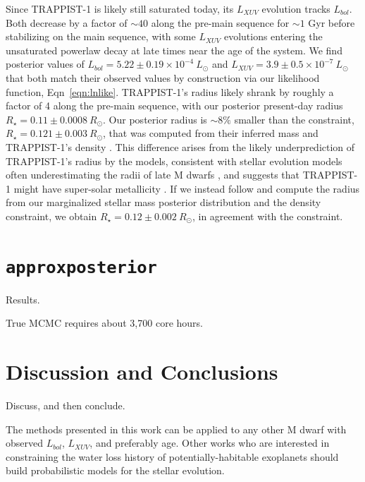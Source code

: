 \documentclass[twocolumn]{aastex62}
\newcommand{\approxposterior}[0]{\texttt{approxposterior}\xspace}
\begin{document}
Since TRAPPIST-1 is likely still saturated today, its $L_{XUV}$ evolution tracks $L_{bol}$. Both decrease by a factor of ${\sim}40$ along the pre-main sequence for ${\sim}1$ Gyr before stabilizing on the main sequence, with some $L_{XUV}$ evolutions entering the unsaturated powerlaw decay at late times near the age of the system. We find posterior values of $L_{bol} = 5.22 \pm{0.19} \times 10^{-4} \ L_{\odot}$ and $L_{XUV} = 3.9 \pm{0.5} \times 10^{-7} \ L_{\odot}$ that both match their observed values by construction via our likelihood function, Eqn~\ref{eqn:lnlike}. TRAPPIST-1's radius likely shrank by roughly a factor of 4 along the pre-main sequence, with our posterior present-day radius $R_{\star} = 0.11 \pm{0.0008} \ R_{\odot}$. Our posterior radius is ${\sim} 8\%$ smaller than the \citet{vanGrootel2018} constraint, $R_{\star} = 0.121 \pm {0.003} \ R_{\odot}$, that was computed from their inferred mass and TRAPPIST-1's density \citep{Delrez2018}. This difference arises from the likely underprediction of TRAPPIST-1's radius by the \citet{Baraffe2015} models, consistent with stellar evolution models often underestimating the radii of late M dwarfs \citep{Reid2005,Spada2013,Jackson2019}, and suggests that TRAPPIST-1 might have super-solar metallicity \citep{Burgasser2017,vanGrootel2018}. If we instead follow \citet{vanGrootel2018} and compute the radius from our marginalized stellar mass posterior distribution and the \citet{Delrez2018} density constraint, we obtain $R_{\star} = 0.12 \pm{0.002} \ R_{\odot}$, in agreement with the \citet{vanGrootel2018} constraint.


\section{\approxposterior} \label{sec:approx}

Results.

True MCMC requires about 3,700 core hours.


\section{Discussion and Conclusions} \label{sec:discussion}

Discuss, and then conclude.

The methods presented in this work can be applied to any other M dwarf with observed $L_{bol}$, $L_{XUV}$, and preferably age. Other works who are interested in constraining the water loss history of potentially-habitable exoplanets should build probabilistic models for the stellar evolution.
\end{document}
